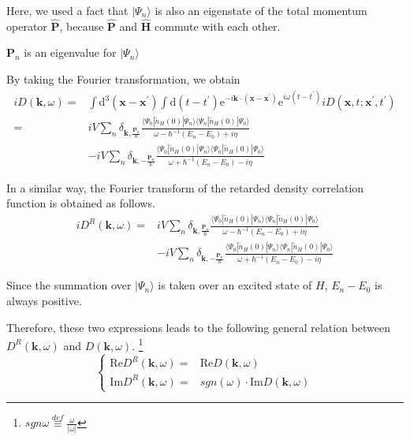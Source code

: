 Here, we used a fact that $|\Psi_n \rangle$ is also an eigenstate of the total momentum operator $\hat{\mathbf{P}}$, because $\hat{\mathbf{P}}$ and $\hat{\mathbf{H}}$ commute with each other.

$\mathbf{P}_n$ is an eigenvalue for $|\Psi_n \rangle$

By taking the Fourier transformation, we obtain
\begin{equation} \label{Eqs3.1.16} \begin{split}
i D(\mathbf{k},\omega) =& \int \mathrm{d}^3 (\mathbf{x}-\mathbf{x}^{'}) \int \mathrm{d} (t-t^{'}) \mathrm{e}^{-i \mathbf{k} \cdot (\mathbf{x}-\mathbf{x}^{'})}\mathrm{e}^{i \omega (t-t^{'})} i D(\mathbf{x},t;\mathbf{x}^{'},t^{'})\\
=& i V \sum_n \delta_{\mathbf{k},\frac{\mathbf{P}_n}{\hbar}}\frac{\langle \Psi_0 | \tilde{n}_H(0) | \Psi_n \rangle \langle \Psi_n | \tilde{n}_H(0) | \Psi_0 \rangle}{ \omega - \hbar^{-1}(E_n-E_0) + i \eta}\\
& -i V \sum_n \delta_{\mathbf{k},-\frac{\mathbf{P}_n}{\hbar}}\frac{\langle \Psi_0 | \tilde{n}_H(0) | \Psi_n \rangle \langle \Psi_n | \tilde{n}_H(0) | \Psi_0 \rangle}{ \omega + \hbar^{-1}(E_n-E_0) - i \eta}
\end{split} \end{equation}

In a similar way, the Fourier transform of the retarded density correlation function is obtained as follows.
\begin{equation} \label{Eqs3.1.17} \begin{split}
i D^R(\mathbf{k},\omega) =& i V \sum_n \delta_{\mathbf{k},\frac{\mathbf{P}_n}{\hbar}}\frac{\langle \Psi_0 | \tilde{n}_H(0) | \Psi_n \rangle \langle \Psi_n | \tilde{n}_H(0) | \Psi_0 \rangle}{ \omega - \hbar^{-1}(E_n-E_0) + i \eta}\\
& -i V \sum_n \delta_{\mathbf{k},-\frac{\mathbf{P}_n}{\hbar}}\frac{\langle \Psi_0 | \tilde{n}_H(0) | \Psi_n \rangle \langle \Psi_n | \tilde{n}_H(0) | \Psi_0 \rangle}{ \omega + \hbar^{-1}(E_n-E_0) - i \eta}
\end{split}\end{equation}

Since the summation over $|\Psi_n\rangle$ is taken over an excited state of $H$, $E_n-E_0$ is always positive.

Therefore, these two expressions leads to the following general relation between $D^R(\mathbf{k},\omega)$ and $D(\mathbf{k},\omega)$.
\footnote{$sgn \omega \overset{def}{\equiv} \frac{\omega}{|\omega|}$}
\begin{equation} \label{Eqs3.1.18} \left\{ \begin{split}
\text{Re} D^R(\mathbf{k},\omega) =& \text{Re} D(\mathbf{k},\omega)\\
\text{Im} D^R(\mathbf{k},\omega) =& sgn(\omega) \cdot \text{Im} D(\mathbf{k},\omega)
\end{split}\right.\end{equation}

